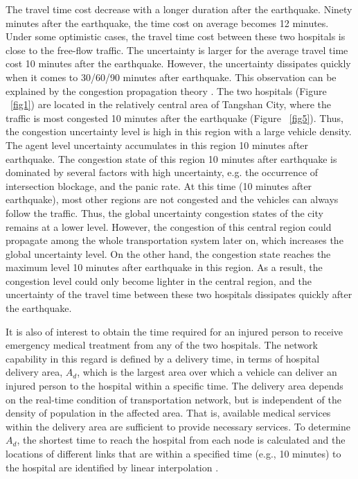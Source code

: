 \documentclass[review,11pt,nonatbib]{elsarticle}
\begin{document}
The travel time cost decrease with a longer duration after the earthquake. Ninety minutes after the earthquake, the time cost on average becomes 12 minutes. Under some optimistic cases, the travel time cost between these two hospitals is close to the free-flow traffic. The uncertainty is larger for the average travel time cost 10 minutes after the earthquake. However, the uncertainty dissipates quickly when it comes to 30/60/90 minutes after earthquake. This observation can be explained by the congestion propagation theory \citep{zhao2016spatio}. The two hospitals (Figure ~\ref{fig1}) are located in the relatively central area of Tangshan City, where the traffic is most congested 10 minutes after the earthquake (Figure ~\ref{fig5}). Thus, the congestion uncertainty level is high in this region with a large vehicle density. The agent level uncertainty accumulates in this region 10 minutes after earthquake. The congestion state of this region 10 minutes after earthquake is dominated by several factors with high uncertainty, e.g. the occurrence of intersection blockage, and the panic rate. At this time (10 minutes after earthquake), most other regions are not congested and the vehicles can always follow the traffic. Thus, the global uncertainty congestion states of the city remains at a lower level. However, the congestion of this central region could propagate among the whole transportation system later on, which increases the global uncertainty level. On the other hand, the congestion state reaches the maximum level 10 minutes after earthquake in this region. As a result, the congestion level could only become lighter in the central region, and the uncertainty of the travel time between these two hospitals dissipates quickly after the earthquake.

\par It is also of interest to obtain the time required for an injured person to receive emergency medical treatment from any of the two hospitals. The network capability in this regard is defined by a delivery time, in terms of hospital delivery area, $A_d$, which is the largest area over which a vehicle can deliver an injured person to the hospital within a specific time. The delivery area depends on the real-time condition of transportation network, but is independent of the density of population in the affected area. That is, available medical services within the delivery area are sufficient to provide necessary services. To determine $A_d$, the shortest time to reach the hospital from each node is calculated and the locations of different links that are within a specified time (e.g., 10 minutes) to the hospital are identified by linear interpolation \citep{feng2017post}.
\end{document}
